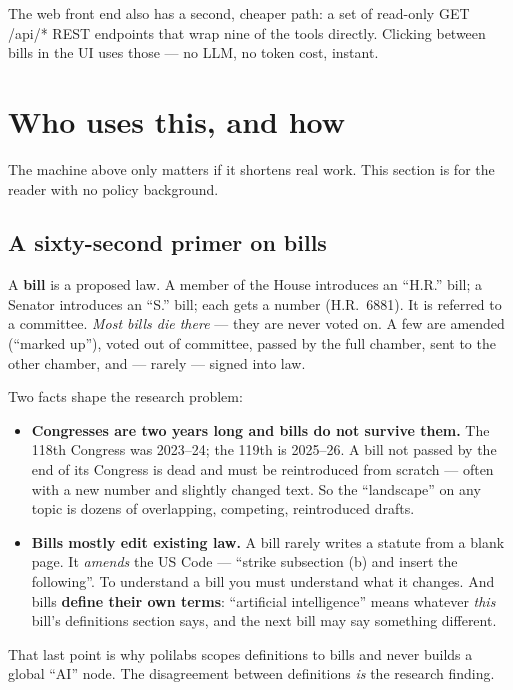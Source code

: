 \documentclass[11pt]{article}
\newcommand{\code}[1]{{\ttfamily\small #1}}
\begin{document}
The web front end also has a second, cheaper path: a set of read-only
\code{GET /api/*} REST endpoints that wrap nine of the tools directly. Clicking
between bills in the UI uses those --- no LLM, no token cost, instant.

\section{Who uses this, and how}

The machine above only matters if it shortens real work. This section is for
the reader with no policy background.

\subsection{A sixty-second primer on bills}

A \textbf{bill} is a proposed law. A member of the House introduces an ``H.R.''
bill; a Senator introduces an ``S.'' bill; each gets a number (H.R.~6881). It
is referred to a committee. \emph{Most bills die there} --- they are never voted
on. A few are amended (``marked up''), voted out of committee, passed by the
full chamber, sent to the other chamber, and --- rarely --- signed into law.

Two facts shape the research problem:

\begin{itemize}[leftmargin=1.4em,itemsep=2pt]
\item \textbf{Congresses are two years long and bills do not survive them.} The
  118th Congress was 2023--24; the 119th is 2025--26. A bill not passed by the
  end of its Congress is dead and must be reintroduced from scratch --- often
  with a new number and slightly changed text. So the ``landscape'' on any
  topic is dozens of overlapping, competing, reintroduced drafts.
\item \textbf{Bills mostly edit existing law.} A bill rarely writes a statute
  from a blank page. It \emph{amends} the US Code --- ``strike subsection (b)
  and insert the following''. To understand a bill you must understand what it
  changes. And bills \textbf{define their own terms}: ``artificial
  intelligence'' means whatever \emph{this} bill's definitions section says, and
  the next bill may say something different.
\end{itemize}

That last point is why polilabs scopes definitions to bills and never builds a
global ``AI'' node. The disagreement between definitions \emph{is} the research
finding.
\end{document}

